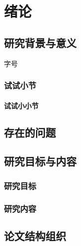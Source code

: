 \chapter{绪论}

\section{研究背景与意义}
字号

\subsection{试试小节}
\subsubsection{试试小小节}

\section{存在的问题}


\section{研究目标与内容}

\subsection{研究目标}

\subsection{研究内容}


\section{论文结构组织}
